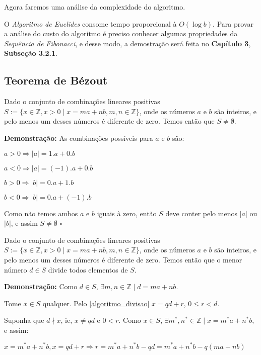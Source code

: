 Agora faremos uma análise da complexidade do algoritmo.

O \textit{Algoritmo de Euclides} consome tempo proporcional à $O(\log b)$. Para provar a análise do custo do algoritmo é preciso conhecer algumas propriedades da \textit{Sequência de Fibonacci}, e desse modo, a 
demostração será feita no \textbf{Capítulo 3}, \textbf{Subseção 3.2.1}.



\subsection{Teorema de Bézout}

\begin{proposition}\label{bezout_conjunto_nao_nulo}
Dado o conjunto de combinações lineares positivas $S := \{x\in\mathbb{Z}, x>0 \mid x = ma + nb, m,n\in \mathbb{Z}\}$, onde os números $a$ e $b$ são inteiros, 
e pelo menos um desses números é diferente de zero. Temos então que $S \neq \emptyset$. 
\end{proposition}
\textbf{Demonstração:}
As combinações possíveis para $a$ e $b$ são:

$a > 0 \Rightarrow |a| = 1.a + 0.b$

$a < 0 \Rightarrow |a| = (-1).a + 0.b$

$b > 0 \Rightarrow |b| = 0.a + 1.b$

$b < 0 \Rightarrow |b| = 0.a + (-1).b$

Como não temos ambos $a$ e $b$ iguais à zero, então $S$ deve conter pelo menos $|a|$ ou $|b|$, e assim $S \neq \emptyset$ $\square$


\begin{corollary}\label{bezout_conjunto_divide}
Dado o conjunto de combinações lineares positivas $S := \{x\in\mathbb{Z}, x>0 \mid x = ma + nb, m,n\in \mathbb{Z}\}$, onde os números $a$ e $b$ são inteiros, 
e pelo menos um desses números é diferente de zero. Temos então que o menor número $d \in S$ divide todos elementos de $S$.
\end{corollary}
\textbf{Demonstração:}
Como $d \in S$, $\exists m,n\in\mathbb{Z} \mid d = ma + nb$.

Tome $x \in S$ qualquer. Pelo \autoref{algoritmo_divisao} $x = qd + r$, $0 \leq r < d$.

Suponha que $d\nmid x$, ie, $x \neq qd$ e $0 < r$. Como $x \in S$, $\exists m^*,n^*\in\mathbb{Z} \mid x = m^*a + n^*b$, e assim:

$x = m^*a + n^*b, x = qd + r \Rightarrow r = m^*a + n^*b - qd = m^*a + n^*b - q(ma + nb)$ 


